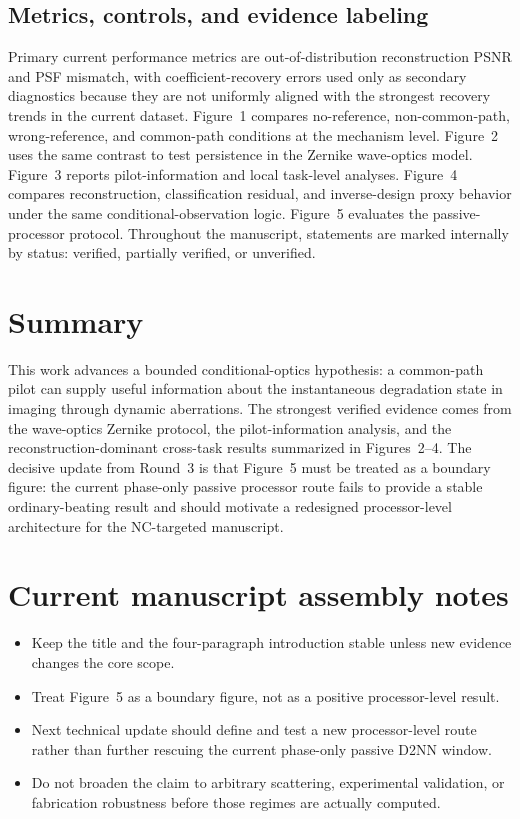 \documentclass[11pt]{article}
\begin{document}
\subsection{Metrics, controls, and evidence labeling}
Primary current performance metrics are out-of-distribution reconstruction PSNR and PSF mismatch, with coefficient-recovery errors used only as secondary diagnostics because they are not uniformly aligned with the strongest recovery trends in the current dataset. Figure~1 compares no-reference, non-common-path, wrong-reference, and common-path conditions at the mechanism level. Figure~2 uses the same contrast to test persistence in the Zernike wave-optics model. Figure~3 reports pilot-information and local task-level analyses. Figure~4 compares reconstruction, classification residual, and inverse-design proxy behavior under the same conditional-observation logic. Figure~5 evaluates the passive-processor protocol. Throughout the manuscript, statements are marked internally by status: verified, partially verified, or unverified.

\section{Summary}
This work advances a bounded conditional-optics hypothesis: a common-path pilot can supply useful information about the instantaneous degradation state in imaging through dynamic aberrations. The strongest verified evidence comes from the wave-optics Zernike protocol, the pilot-information analysis, and the reconstruction-dominant cross-task results summarized in Figures~2--4. The decisive update from Round~3 is that Figure~5 must be treated as a boundary figure: the current phase-only passive processor route fails to provide a stable ordinary-beating result and should motivate a redesigned processor-level architecture for the NC-targeted manuscript.

\section*{Current manuscript assembly notes}
\begin{itemize}
  \item Keep the title and the four-paragraph introduction stable unless new evidence changes the core scope.
  \item Treat Figure~5 as a boundary figure, not as a positive processor-level result.
  \item Next technical update should define and test a new processor-level route rather than further rescuing the current phase-only passive D2NN window.
  \item Do not broaden the claim to arbitrary scattering, experimental validation, or fabrication robustness before those regimes are actually computed.
\end{itemize}
\end{document}
